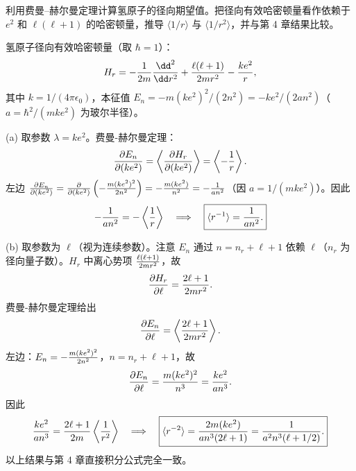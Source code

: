 \begin{question}
利用费曼--赫尔曼定理计算氢原子的径向期望值。把径向有效哈密顿量看作依赖于 $e^2$ 和 $\ell(\ell+1)$ 的哈密顿量，推导 $\langle1/r\rangle$ 与 $\langle1/r^2\rangle$，并与第 4 章结果比较。
\end{question}
\begin{solution}
氢原子径向有效哈密顿量（取 $\hbar=1$）：
\[
H_r = -{1\over2m}{\dd^2\over\dd r^2} + {\ell(\ell+1)\over2mr^2} - {ke^2\over r},
\]
其中 $k=1/(4\pi\epsilon_0)$，本征值 $E_n=-m(ke^2)^2/(2n^2)=-ke^2/(2an^2)$（$a=\hbar^2/(mke^2)$ 为玻尔半径）。

(a) 取参数 $\lambda=ke^2$。费曼-赫尔曼定理：
\[
{\partial E_n\over\partial(ke^2)} = \left\langle {\partial H_r\over\partial(ke^2)} \right\rangle = \left\langle -{1\over r} \right\rangle.
\]
左边 ${\partial E_n\over\partial(ke^2)} = {\partial\over\partial(ke^2)}\left(-{m(ke^2)^2\over2n^2}\right) = -{m(ke^2)\over n^2} = -{1\over a n^2}$（因 $a=1/(mke^2)$）。因此
\[
-{1\over a n^2} = -\left\langle {1\over r} \right\rangle\quad\Longrightarrow\quad
\boxed{\langle r^{-1}\rangle = {1\over an^2}.}
\]

(b) 取参数为 $\ell$（视为连续参数）。注意 $E_n$ 通过 $n=n_r+\ell+1$ 依赖 $\ell$（$n_r$ 为径向量子数）。$H_r$ 中离心势项 ${\ell(\ell+1)\over2mr^2}$，故
\[
{\partial H_r\over\partial\ell} = {2\ell+1\over2mr^2}.
\]
费曼-赫尔曼定理给出
\[
{\partial E_n\over\partial\ell} = \left\langle {2\ell+1\over2mr^2} \right\rangle.
\]
左边：$E_n=-{m(ke^2)^2\over2n^2}$，$n=n_r+\ell+1$，故
\[
{\partial E_n\over\partial\ell} = {m(ke^2)^2\over n^3} = {ke^2\over a n^3}.
\]
因此
\[
{ke^2\over a n^3} = {2\ell+1\over2m}\left\langle{1\over r^2}\right\rangle
\quad\Longrightarrow\quad
\boxed{\langle r^{-2}\rangle = {2m(ke^2)\over a n^3(2\ell+1)} = {1\over a^2 n^3(\ell+1/2)}.}
\]
以上结果与第 4 章直接积分公式完全一致。
\end{solution}


